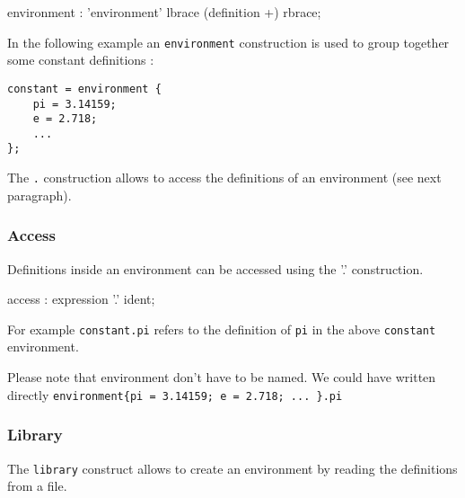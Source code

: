 
\begin{rail}
environment : 'environment' lbrace (definition +) rbrace; 
\end{rail}

In the following example an \lstinline'environment' construction is used to group together some constant definitions :

\begin{lstlisting}
constant = environment {
	pi = 3.14159;
	e = 2.718;
	...
};
\end{lstlisting}
The  \lstinline'.' construction allows to access the definitions of an environment (see next paragraph).

\subsubsection{Access} 
Definitions inside an environment can be accessed using 
the '.' construction. 


\begin{rail}
access :    expression '.' ident;       
\end{rail}

For example \lstinline'constant.pi' refers to the definition of \lstinline'pi' in the above \lstinline'constant' environment.

Please note that environment don't have to be named. We could have written directly 
\lstinline'environment{pi = 3.14159; e = 2.718; ... }.pi'

\subsubsection{Library} 
The \lstinline'library' construct allows to create an environment by reading the definitions from a file.

